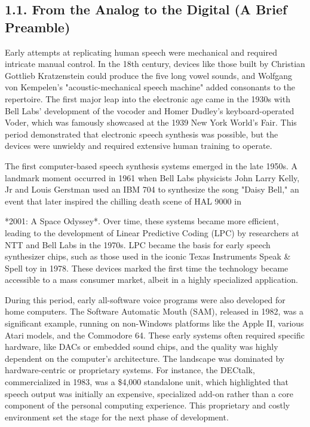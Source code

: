 \subsection{1.1. From the Analog to the Digital (A Brief Preamble)}
Early attempts at replicating human speech were mechanical and required
intricate manual control. In the 18th century, devices like those built
by Christian Gottlieb Kratzenstein could produce the five long vowel
sounds, and Wolfgang von Kempelen's "acoustic-mechanical speech
machine" added consonants to the repertoire.\supercite{1} The first major leap
into the electronic age came in the 1930s with Bell Labs' development
of the vocoder and Homer Dudley's keyboard-operated Voder, which was
famously showcased at the 1939 New York World's Fair.\supercite{1} This period
demonstrated that electronic speech synthesis was possible, but the
devices were unwieldy and required extensive human training to operate.

The first computer-based speech synthesis systems emerged in the late
1950s.\supercite{1} A landmark moment occurred in 1961 when Bell Labs physicists
John Larry Kelly, Jr and Louis Gerstman used an IBM 704 to synthesize
the song "Daisy Bell," an event that later inspired the chilling death
scene of HAL 9000 in

*2001: A Space Odyssey*.\supercite{2} Over time, these systems became more
efficient, leading to the development of Linear Predictive Coding (LPC)
by researchers at NTT and Bell Labs in the 1970s.\supercite{1} LPC became the
basis for early speech synthesizer chips, such as those used in the
iconic Texas Instruments Speak & Spell toy in 1978.\supercite{1} These devices
marked the first time the technology became accessible to a mass
consumer market, albeit in a highly specialized application.

During this period, early all-software voice programs were also
developed for home computers. The Software Automatic Mouth (SAM),
released in 1982, was a significant example, running on non-Windows
platforms like the Apple II, various Atari models, and the Commodore
64.\supercite{1} These early systems often required specific hardware, like DACs
or embedded sound chips, and the quality was highly dependent on the
computer's architecture.\supercite{1} The landscape was dominated by
hardware-centric or proprietary systems. For instance, the DECtalk,
commercialized in 1983, was a \$4,000 standalone unit, which highlighted
that speech output was initially an expensive, specialized add-on rather
than a core component of the personal computing experience.\supercite{2} This
proprietary and costly environment set the stage for the next phase of
development.

